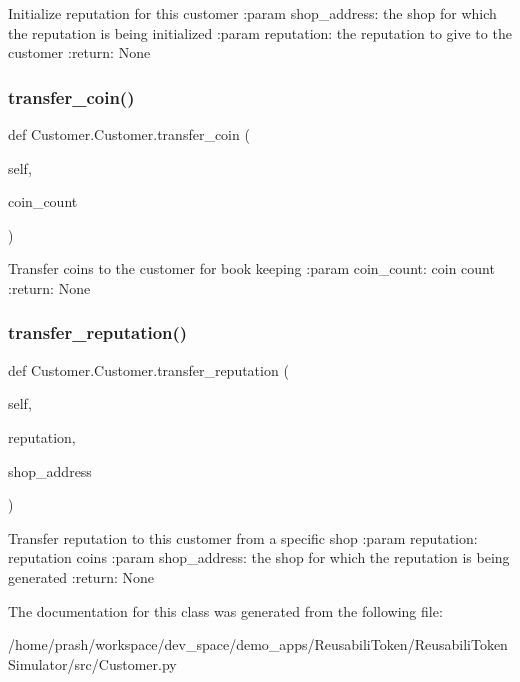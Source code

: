 \begin{DoxyVerb}Initialize reputation for this customer
:param shop_address: the shop for which the reputation is being initialized
:param reputation: the reputation to give to the customer
:return: None
\end{DoxyVerb}
 \mbox{\label{class_customer_1_1_customer_ace618f142ffda53d5538c0f354a0457a}} 
\subsubsection{\texorpdfstring{transfer\+\_\+coin()}{transfer\_coin()}}
{\footnotesize\ttfamily def Customer.\+Customer.\+transfer\+\_\+coin (\begin{DoxyParamCaption}\item[{}]{self,  }\item[{}]{coin\+\_\+count }\end{DoxyParamCaption})}

\begin{DoxyVerb}Transfer coins to the customer for book keeping
:param coin_count: coin count
:return: None
\end{DoxyVerb}
 \mbox{\label{class_customer_1_1_customer_a36bf1ca43a67bf563793e1ad7558711f}} 
\subsubsection{\texorpdfstring{transfer\+\_\+reputation()}{transfer\_reputation()}}
{\footnotesize\ttfamily def Customer.\+Customer.\+transfer\+\_\+reputation (\begin{DoxyParamCaption}\item[{}]{self,  }\item[{}]{reputation,  }\item[{}]{shop\+\_\+address }\end{DoxyParamCaption})}

\begin{DoxyVerb}Transfer reputation to this customer from a specific shop
:param reputation: reputation coins
:param shop_address: the shop for which the reputation is being generated
:return: None
\end{DoxyVerb}
 

The documentation for this class was generated from the following file\+:\begin{DoxyCompactItemize}
\item 
/home/prash/workspace/dev\+\_\+space/demo\+\_\+apps/\+Reusabili\+Token/\+Reusabili\+Token\+Simulator/src/Customer.\+py\end{DoxyCompactItemize}
